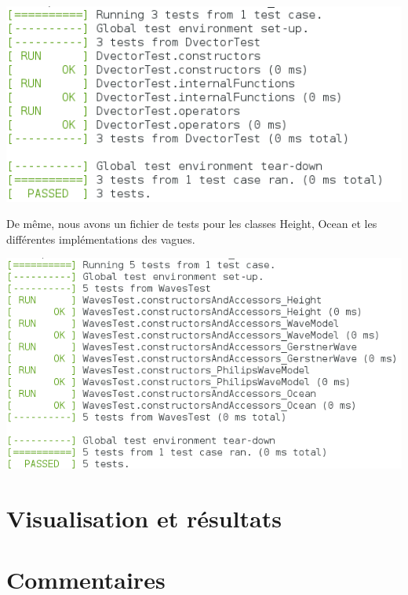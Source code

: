 \documentclass{article}
\begin{document}
\vspace{0.5cm}

\includegraphics[scale=0.7]{./res/Test_Dvector.png}

\vspace{0.5cm}

De même, nous avons un fichier de tests pour les classes Height, Ocean et les différentes implémentations des vagues.

\vspace{0.5cm}

\includegraphics[scale=0.7]{./res/Test_Waves.png}

\vspace{1cm}


\section{Visualisation et résultats}

\vspace{1cm}

\section{Commentaires}
\end{document}
